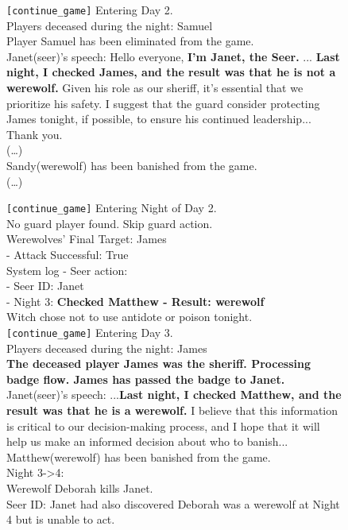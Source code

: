\begin{figure}[htbp]
\begin{tcolorbox}[colback=green!2!white, colframe=gray!50!green]
\begin{minipage}{\linewidth}
\texttt{[continue\_game]} Entering Day 2.  \\
Players deceased during the night: Samuel  \\
Player Samuel has been eliminated from the game.\\
Janet(seer)'s speech: Hello everyone, \textbf{I'm Janet, the Seer.} ... \textbf{Last night, I checked James, and the result was that he is not a werewolf.} Given his role as our sheriff, it's essential that we prioritize his safety. I suggest that the guard consider protecting James tonight, if possible, to ensure his continued leadership... Thank you.\\
(\ldots)  \\
Sandy(werewolf) has been banished from the game.  \\
(\ldots)  

\texttt{[continue\_game]} Entering Night of Day 2. \\ 
No guard player found. Skip guard action.  \\
Werewolves' Final Target: James  \\
 - Attack Successful: True  \\  
System log - Seer action:  \\
 - Seer ID: Janet  \\
 - Night 3: \textbf{Checked Matthew - Result: werewolf } \\
Witch chose not to use antidote or poison tonight.  \\

\texttt{[continue\_game]} Entering Day 3.  \\
Players deceased during the night: James  \\
\textbf{The deceased player James was the sheriff. Processing badge flow. James has passed the badge to Janet.  }  \\
Janet(seer)'s speech: ...\textbf{Last night, I checked Matthew, and the result was that he is a werewolf.} I believe that this information is critical to our decision-making process, and I hope that it will help us make an informed decision about who to banish...\\
Matthew(werewolf) has been banished from the game.  \\

Night 3->4:  \\
Werewolf Deborah kills Janet.  \\
Seer ID: Janet had also discovered Deborah was a werewolf at Night 4 but is unable to act.  \\


\end{minipage}
\end{tcolorbox}
\end{figure}
